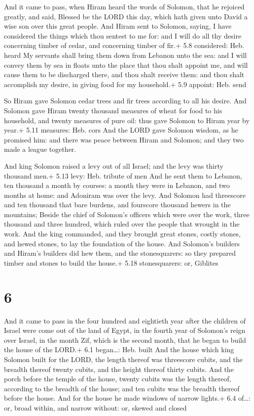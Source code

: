  And it came to pass, when Hiram heard the words of
Solomon, that he rejoiced greatly, and said, Blessed be the LORD this
day, which hath given unto David a wise son over this great people.
 And Hiram sent to Solomon, saying, I have considered the
things which thou sentest to me for: and I will do all thy desire
concerning timber of cedar, and concerning timber of fir.+ 5.8
considered: Heb. heard  My servants shall bring them down
from Lebanon unto the sea: and I will convey them by sea in floats unto
the place that thou shalt appoint me, and will cause them to be
discharged there, and thou shalt receive them: and thou shalt accomplish
my desire, in giving food for my household.+ 5.9 appoint: Heb. send

 So Hiram gave Solomon cedar trees and fir trees according
to all his desire.  And Solomon gave Hiram twenty thousand
measures of wheat for food to his household, and twenty measures of pure
oil: thus gave Solomon to Hiram year by year.+ 5.11 measures: Heb. cors
 And the LORD gave Solomon wisdom, as he promised him: and
there was peace between Hiram and Solomon; and they two made a league
together.

 And king Solomon raised a levy out of all Israel; and
the levy was thirty thousand men.+ 5.13 levy: Heb. tribute of men
 And he sent them to Lebanon, ten thousand a month by
courses: a month they were in Lebanon, and two months at home: and
Adoniram was over the levy.  And Solomon had threescore and
ten thousand that bare burdens, and fourscore thousand hewers in the
mountains;  Beside the chief of Solomon's officers which
were over the work, three thousand and three hundred, which ruled over
the people that wrought in the work.  And the king
commanded, and they brought great stones, costly stones, and hewed
stones, to lay the foundation of the house.  And Solomon's
builders and Hiram's builders did hew them, and the stonesquarers: so
they prepared timber and stones to build the house.+ 5.18 stonesquarers:
or, Giblites

\hypertarget{section-5}{%
\section{6}\label{section-5}}

 And it came to pass in the four hundred and eightieth year
after the children of Israel were come out of the land of Egypt, in the
fourth year of Solomon's reign over Israel, in the month Zif, which is
the second month, that he began to build the house of the LORD.+ 6.1
began\ldots: Heb. built  And the house which king Solomon
built for the LORD, the length thereof was threescore cubits, and the
breadth thereof twenty cubits, and the height thereof thirty cubits.
 And the porch before the temple of the house, twenty cubits
was the length thereof, according to the breadth of the house; and ten
cubits was the breadth thereof before the house.  And for
the house he made windows of narrow lights.+ 6.4 of\ldots: or, broad
within, and narrow without: or, skewed and closed

